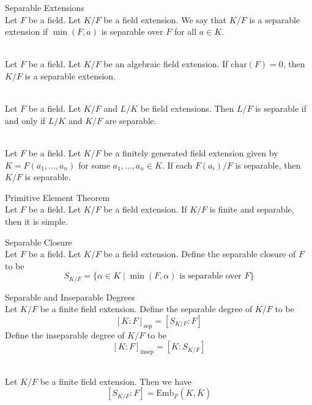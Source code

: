 \documentclass[a4paper]{article}
\begin{document}
\begin{defn}{Separable Extensions}{}\\
Let $F$ be a field. Let $K/F$ be a field extension. We say that $K/F$ is a separable extension if $\min(F,a)$ is separable over $F$ for all $a\in K$. 
\end{defn}

\begin{eg}{}{}\\
Let $F$ be a field. Let $K/F$ be an algebraic field extension. If $\text{char}(F)=0$, then $K/F$ is a separable extension. 
\end{eg}

\begin{prp}{}{}\\
Let $F$ be a field. Let $K/F$ and $L/K$ be field extensions. Then $L/F$ is separable if and only if $L/K$ and $K/F$ are separable. 
\end{prp}

\begin{prp}{}{}\\
Let $F$ be a field. Let $K/F$ be a finitely generated field extension given by $K=F(a_1,\dots,a_n)$ for some $a_1,\dots,a_n\in K$. If each $F(a_i)/F$ is separable, then $K/F$ is separable. 
\end{prp}

\begin{thm}{Primitive Element Theorem}{}\\
Let $F$ be a field. Let $K/F$ be a field extension. If $K/F$ is finite and separable, then it is simple. 
\end{thm}

\begin{defn}{Separable Closure}{}\\
Let $F$ be a field. Let $K/F$ be a field extension. Define the separable closure of $F$ to be $$S_{K/F}=\{\alpha\in K\;|\;\min(F,\alpha)\text{ is separable over }F\}$$
\end{defn}

\begin{defn}{Separable and Inseparable Degrees}{}\\
Let $K/F$ be a finite field extension. Define the separable degree of $K/F$ to be $$[K:F]_{\text{sep}}=[S_{K/F}:F]$$ Define the inseparable degree of $K/F$ to be $$[K:F]_{\text{insep}}=[K:S_{K/F}]$$
\end{defn}

\begin{lmm}{}{}\\
Let $K/F$ be a finite field extension. Then we have $$[S_{K/F}:F]=\text{Emb}_F(K,\overline{K})$$
\end{lmm}
\end{document}
